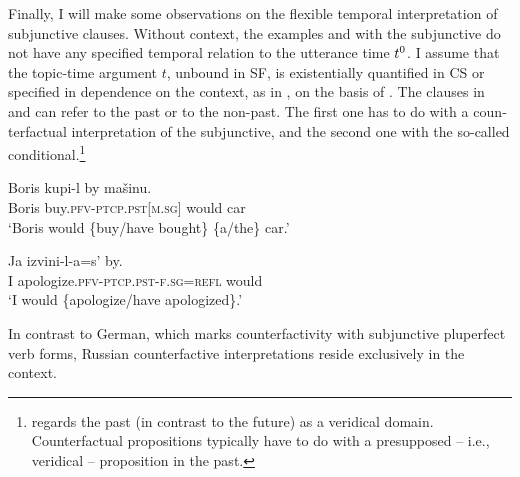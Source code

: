 \documentclass[output=paper,colorlinks,citecolor=brown]{langscibook}
\begin{document}
\begin{otherlanguage}{english}
Finally, I will make some observations on the flexible temporal interpretation of subjunctive clauses. Without context, the examples  and  with the subjunctive do not have any specified temporal relation to the utterance time $t\textsuperscript{0}$. I assume that the topic-time argument $t$, unbound in SF, is existentially quantified in CS or specified in dependence on the context, as in , on the basis of . The clauses in  and  can refer to the past or to the non-past. The first one has to do with a counterfactual interpretation of the subjunctive, and the second one with the so-called conditional.\footnote{\textcite{Giannakidou2014} regards the past (in contrast to the future) as a veridical domain. Counterfactual propositions typically have to do with a presupposed -- i.e., veridical -- proposition in the past.
}

\ea\label{ex:16:39}
\gll Boris kupi-l by mašinu. \\
   Boris buy.\textsc{pfv}-\textsc{ptcp.pst}[\textsc{m.sg}] would %
   car  \\
\glt `Boris would \{buy/have bought\} \{a/the\} car.'
\z

\ea\label{ex:16:40}
\gll Ja izvini-l-a=s' by. \\
   I apologize.\textsc{pfv}-\textsc{ptcp.pst}-\textsc{f.sg}=\textsc{refl} would \\
\glt `I would \{apologize/have apologized\}.'
\z

\noindent In contrast to German, which marks counterfactivity with subjunctive pluperfect verb forms, Russian counterfactive interpretations reside exclusively in the context.

\begin{exe}
\ex \label{ex:16:41}
\begin{xlist}
\end{xlist}
\end{exe}


\end{otherlanguage}
\end{document}
